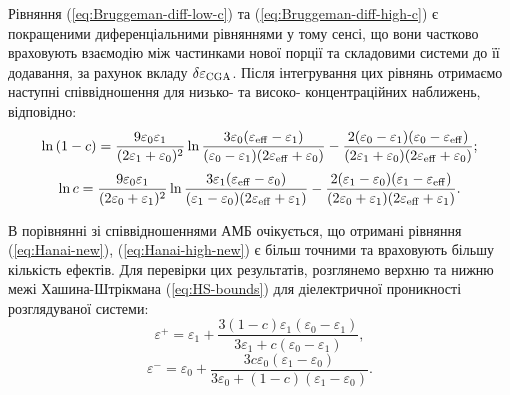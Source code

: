 \documentclass[14pt,twoside]{vakthesis}
\begin{document}
Рівняння (\ref{eq:Bruggeman-diff-low-c}) та (\ref{eq:Bruggeman-diff-high-c}) є покращеними диференціальними рівняннями у тому сенсі, що вони частково враховують взаємодію між частинками нової порції та складовими системи до її додавання, за рахунок вкладу $\delta\varepsilon_{\rm CGA}$. Після інтегрування цих рівнянь отримаємо наступні співвідношення для низько- та високо- концентраційних наближень, відповідно:
\begin{equation}\label{eq:Hanai-new}
\begin{split}
\ln{(1-c)} = \frac{9 \varepsilon_0 \varepsilon_1}{(2\varepsilon_1 + \varepsilon_0)^2} \ln{ \frac{3\varepsilon_0 (\varepsilon_{\rm eff} - \varepsilon_1)}{(\varepsilon_0 - \varepsilon_1) (2\varepsilon_{\rm eff} + \varepsilon_0)} }
- \frac{2(\varepsilon_0 - \varepsilon_1) (\varepsilon_0 - \varepsilon_{\rm eff})}{(2\varepsilon_1 + \varepsilon_0) (2\varepsilon_{\rm eff} + \varepsilon_0)};
\end{split}
\end{equation}
\begin{equation}\label{eq:Hanai-high-new}
\ln{c} = \frac{9 \varepsilon_0 \varepsilon_1}{(2\varepsilon_0 + \varepsilon_1)^2} \ln{ \frac{3\varepsilon_1 (\varepsilon_{\rm eff} - \varepsilon_0)}{(\varepsilon_1 - \varepsilon_0) (2\varepsilon_{\rm eff} + \varepsilon_1)} }
- \frac{2(\varepsilon_1 - \varepsilon_0) (\varepsilon_1 - \varepsilon_{\rm eff})}{(2\varepsilon_0 + \varepsilon_1) (2\varepsilon_{\rm eff} + \varepsilon_1)}.
\end{equation}



В порівнянні зі співвідношеннями АМБ очікується, що отримані рівняння (\ref{eq:Hanai-new}), (\ref{eq:Hanai-high-new}) є більш точними та враховують більшу кількість ефектів. Для перевірки цих результатів, розглянемо верхню та нижню межі Хашина-Штрікмана (\ref{eq:HS-bounds}) для діелектричної проникності розглядуваної системи:
\begin{equation}\label{eq:HS-upper}
\varepsilon^{+} = \varepsilon_1 + \frac{3(1 - c)\varepsilon_1 (\varepsilon_0 - \varepsilon_1)}{3\varepsilon_1 + c
	(\varepsilon_0 - \varepsilon_1)},
\end{equation}
\begin{equation}\label{eq:HS-lower}
\varepsilon^{-} = \varepsilon_0 + \frac{3c\varepsilon_0 (\varepsilon_1 - \varepsilon_0)}{3\varepsilon_0 + (1-c) (\varepsilon_1 - \varepsilon_0)}.
\end{equation}
\end{document}
